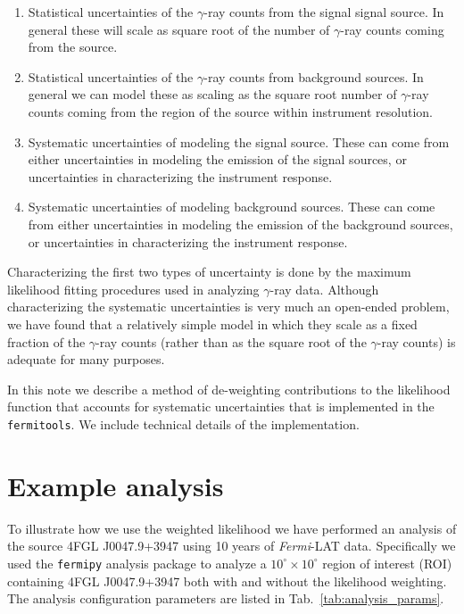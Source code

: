 \documentclass[preprint]{aastex}
\begin{document}
\begin{enumerate}
\item{Statistical uncertainties of the $\gamma$-ray counts from the signal signal source.  
    In general these will scale as square root of the number of $\gamma$-ray counts coming 
    from the source.}
\item{Statistical uncertainties of the $\gamma$-ray counts from background sources.  
    In general we can model these as scaling as the square root number of $\gamma$-ray counts 
    coming from the region of the source  within instrument resolution.}
\item{Systematic uncertainties of modeling the signal source.  These can come from either
    uncertainties in modeling the emission of the signal sources, or uncertainties in 
    characterizing the instrument response.}
\item{Systematic uncertainties of modeling background sources.  These can come from either
    uncertainties in modeling the emission of the background sources, or uncertainties in 
    characterizing the instrument response.}
\end{enumerate}

Characterizing the first two types of uncertainty is done by the maximum likelihood fitting 
procedures used in analyzing $\gamma$-ray data.  Although characterizing the systematic 
uncertainties is very much an open-ended problem,  we have found that a relatively simple 
model in which they scale as a fixed fraction of the
$\gamma$-ray counts (rather than as the square root of the $\gamma$-ray counts) is adequate
for many purposes.

In this note we describe a method of de-weighting contributions to the likelihood function that
accounts for systematic uncertainties that is implemented in the {\tt fermitools}.  
We include technical details of the implementation.


\section{Example analysis}

To illustrate how we use the weighted likelihood we have performed 
an analysis of the source 4FGL J0047.9+3947 using 10 years of {\it Fermi}-LAT 
data.  Specifically we used the {\tt fermipy} analysis package
to analyze a $10^\circ \times 10^\circ$ region of interest (ROI)
containing 4FGL J0047.9+3947 both with and without the likelihood weighting.
The analysis configuration parameters are listed in Tab.~\ref{tab:analysis_params}.
\end{document}
